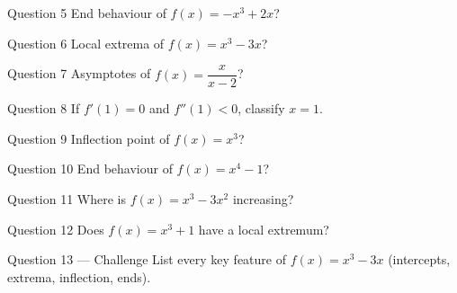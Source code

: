 \documentclass[11pt]{article}
\begin{document}
\begin{qbox}{Question 5}
End behaviour of $f(x)=-x^3+2x$?\workspace{2.4cm}
\end{qbox}

\begin{qbox}{Question 6}
Local extrema of $f(x)=x^3-3x$?\workspace{2.4cm}
\end{qbox}

\begin{qbox}{Question 7}
Asymptotes of $f(x)=\dfrac{x}{x-2}$?\workspace{2.4cm}
\end{qbox}

\begin{qbox}{Question 8}
If $f'(1)=0$ and $f''(1)<0$, classify $x=1$.\workspace{2.4cm}
\end{qbox}

\begin{qbox}{Question 9}
Inflection point of $f(x)=x^3$?\workspace{2.4cm}
\end{qbox}

\begin{qbox}{Question 10}
End behaviour of $f(x)=x^4-1$?\workspace{2.4cm}
\end{qbox}

\begin{qbox}{Question 11}
Where is $f(x)=x^3-3x^2$ increasing?\workspace{2.4cm}
\end{qbox}

\begin{qbox}{Question 12}
Does $f(x)=x^3+1$ have a local extremum?\workspace{2.4cm}
\end{qbox}

\begin{qbox}{Question 13 --- Challenge}
List every key feature of $f(x)=x^3-3x$ (intercepts, extrema, inflection, ends).\workspace{4cm}
\end{qbox}

\clearpage
{}
\end{document}
